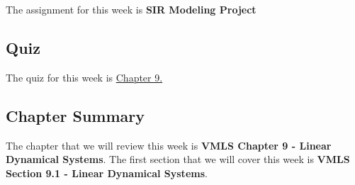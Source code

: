 The assignment for this week is \textbf{SIR Modeling Project}  

\subsection{Quiz}

The quiz for this week is \href{https://applied.cs.colorado.edu/mod/quiz/view.php?id=50777}{Chapter 9.}  

\subsection{Chapter Summary}

The chapter that we will review this week is \textbf{VMLS Chapter 9 - Linear Dynamical Systems}. The first section that we will cover this week is \textbf{VMLS Section 9.1 - Linear Dynamical Systems}.

